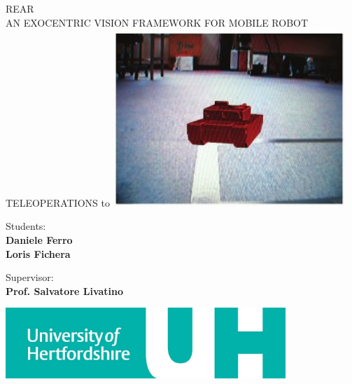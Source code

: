 \begin{titlepage}
  \begin{center}
    \uppercase{ \textsf{
        \LARGE{REAR} \\ 
        \vspace{0.5truecm}
        \large{an exocentric vision framework for mobile robot teleoperations}
    }}
    \hbox to \textwidth{\hrulefill}
    \vfill
    \includegraphics[width=250pt]{img/virtual_exocentric.jpg}
    \vfill
    
    \begin{flushright}
      \textsf{Students:} \\
      \textsf{\textbf{Daniele Ferro}} \\                      
      \textsf{\textbf{Loris Fichera}}
      \vspace{0.5 truecm}
                
      \textsf{Supervisor:} \\
      \textsf{\textbf{Prof. Salvatore Livatino }}\\
    \end{flushright}
    
    \vspace{0.5 truecm}
    \hfill \includegraphics[width=300pt]{img/uni_logo.jpg}  %
    
  \end{center}
  
\end{titlepage}

\setlength{\baselineskip}{1.3\baselineskip} %

\tableofcontents

\newpage
